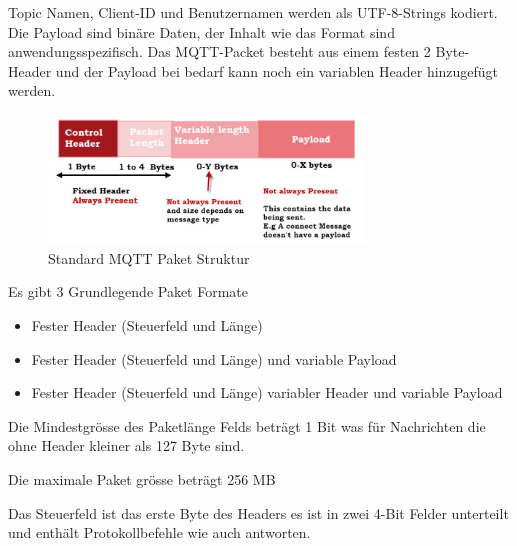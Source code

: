 Topic Namen, Client-ID und Benutzernamen werden als UTF-8-Strings kodiert. Die Payload sind binäre Daten, der Inhalt wie das Format sind anwendungsspezifisch. Das MQTT-Packet besteht aus einem festen 2 Byte-Header und der Payload bei bedarf kann noch ein variablen Header hinzugefügt werden.

\begin{figure}[H]
	\centering
	\includegraphics[width=0.75\textwidth]{graphics/MQTT-Standard-Packet.jpg}
	\caption{Standard MQTT Paket Struktur \cite{steve_understanding_nodate}} 	
	\label{pic: Struktur}
\end{figure} 

Es gibt 3 Grundlegende Paket Formate

\begin{itemize}
	\item Fester Header (Steuerfeld und Länge)\\
	\item Fester Header (Steuerfeld und Länge) und variable Payload\\
	\item Fester Header (Steuerfeld und Länge) variabler Header und variable Payload\\
\end{itemize}

Die Mindestgrösse des Paketlänge Felds beträgt 1 Bit was für Nachrichten die ohne Header kleiner als 127 Byte sind. 

Die maximale Paket grösse beträgt 256 MB

Das Steuerfeld ist das erste Byte des Headers es ist in zwei 4-Bit Felder unterteilt und enthält Protokollbefehle wie auch antworten.